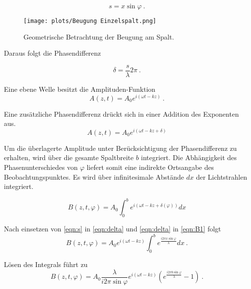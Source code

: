 \begin{equation}
  s = x\sin{\varphi} \:.
  \label{eqn:s}
\end{equation}

\begin{figure}
  \centering
  \texttt{[image: plots/Beugung Einzelspalt.png]}
  \caption{Geometrische Betrachtung der Beugung am Spalt.\cite{Versuchsanleitung}}
  \label{fig:BeugSpalt}
\end{figure}

Daraus folgt die Phasendifferenz

\begin{equation}
  \delta = \frac{s}{\lambda}2\pi \:.
  \label{eqn:delta}
\end{equation}



Eine ebene Welle besitzt die Amplituden-Funktion 
\begin{equation}
  A(z, t) = A_0e^{i(\omega t - kz)} \:.
\end{equation}

Eine zusätzliche Phasendifferenz drückt sich in einer Addition des Exponenten aus.
\begin{equation*}
  A(z, t) = A_0e^{i(\omega t - kz + \delta)}
\end{equation*}

Um die überlagerte Amplitude unter Berücksichtigung der Phasendifferenz zu erhalten, wird über die gesamte Spaltbreite $b$ integriert.
Die Abhängigkeit des Phasenunterschiedes von $\varphi$ liefert somit eine indirekte Ortsangabe des Beobachtungspunktes.
Es wird über infinitesimale Abstände $dx$ der Lichtstrahlen integriert.

\begin{equation}
  B(z, t, \varphi) = A_0\int_0^be^{i(\omega t - kz + \delta(\varphi))}dx
  \label{eqn:B1}
\end{equation}

Nach einsetzen von \eqref{eqn:s} in \eqref{eqn:delta} und \eqref{eqn:delta} in \eqref{eqn:B1} folgt
\begin{equation*}
  B(z, t, \varphi) = A_0e^{i(\omega t - kz)}\int_0^be^{\frac{i2\pi x \sin{\varphi}}{\lambda}}dx \:.
\end{equation*}

Lösen des Integrals führt zu
\begin{equation}
  B(z, t, \varphi) = A_0\frac{\lambda}{i2\pi \sin{\varphi}}e^{i(\omega t - kz)}(e^{\frac{i2\pi b \sin{\varphi}}{\lambda}}-1) \:.
  \label{eqn:nachInt}
\end{equation}

